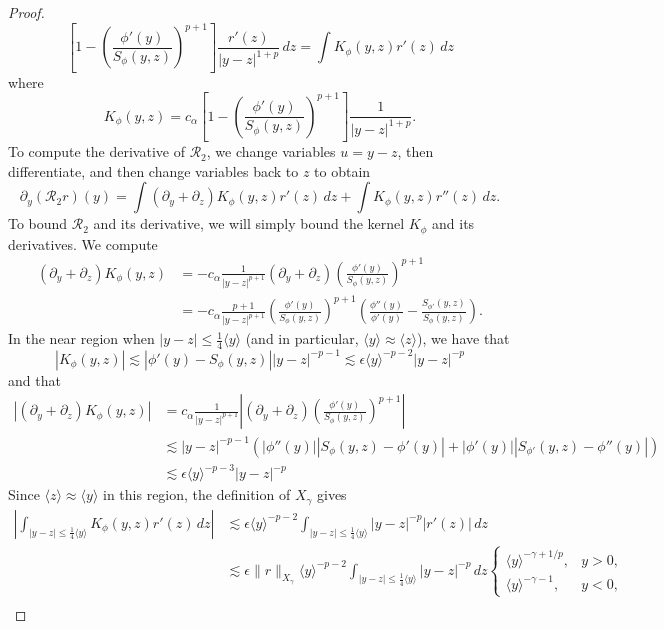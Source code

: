 \documentclass[11pt]{amsart}
\theoremstyle{definition}
\theoremstyle{remark}
\numberwithin{equation}{section}
\newcommand{\mc}[1]{\mathcal{#1}}
\newcommand{\ang}[1]{\langle #1 \rangle}
\begin{document}
\begin{proof}
\[        \left[1-\left(\frac{\phi'(y)}{S_\phi(y,z)}\right)^{p+1}\right]
        \frac{r'(z)}{|y-z|^{1+p}}\,dz = \int K_\phi(y, z)r'(z) \, dz\]
where
\[K_\phi(y, z) = c_\alpha\left[1-\left(\frac{\phi'(y)}{S_\phi(y,z)}\right)^{p+1}\right]\frac{1}{|y-z|^{1+p}}.\]
To compute the derivative of $\mc{R}_2$, we change variables $u = y - z$, then differentiate, and then change variables back to $z$ to obtain
\[\partial_y(\mc{R}_2r)(y) = \int (\partial_y + \partial_z) K_\phi(y, z) r'(z) \, dz + \int K_\phi(y, z) r''(z) \, dz.\]
To bound $\mc{R}_2$ and its derivative, we will simply bound the kernel $K_\phi$ and its derivatives.
We compute 
\begin{align*}
    (\partial_y + \partial_z)K_\phi(y, z) & = -c_\alpha \frac{1}{|y - z|^{p + 1}}(\partial_y + \partial_z)\left(\frac{\phi'(y)}{S_\phi(y,z)}\right)^{p+1} \\
    & = -c_\alpha \frac{p + 1}{|y - z|^{p + 1}}\left(\frac{\phi'(y)}{S_\phi(y,z)}\right)^{p+1}\left(\frac{\phi''(y)}{\phi'(y)} - \frac{S_{\phi'}(y, z)}{S_\phi(y,z)}\right).
\end{align*}
In the near region when $|y - z| \leq \frac{1}{4}\ang{y}$ (and in particular, $\ang{y} \approx \ang{z}$), we have that
\[|K_\phi(y, z)| \lesssim |\phi'(y) - S_\phi(y, z)||y - z|^{-p-1} \lesssim \epsilon \ang{y}^{-p - 2}|y - z|^{-p}\]
and that
\begin{align*}
    |(\partial_y + \partial_z)K_\phi(y, z)| & = c_\alpha \frac{1}{|y - z|^{p + 1}}\left|(\partial_y + \partial_z)\left(\frac{\phi'(y)}{S_\phi(y,z)}\right)^{p+1}\right| \\
    & \lesssim |y - z|^{-p-1}(|\phi''(y)||S_\phi(y,z) - \phi'(y)| + |\phi'(y)||S_{\phi'}(y,z) - \phi''(y)|) \\
    & \lesssim \epsilon \ang{y}^{-p - 3}|y - z|^{-p}
\end{align*}
Since $\ang{z}\approx\ang{y}$ in this region, the definition of $X_\gamma$ gives
\begin{align*}
    \left|\int_{|y - z| \leq \frac{1}{4}\ang{y}} K_\phi(y, z) r'(z) \, dz\right| & \lesssim \epsilon \ang{y}^{-p-2}\int_{|y - z| \leq \frac{1}{4}\ang{y}} |y - z|^{-p}|r'(z)| \, dz \\
    & \lesssim \epsilon \|r\|_{X_\gamma}\ang{y}^{-p-2}\int_{|y - z| \leq \frac{1}{4}\ang{y}} |y - z|^{-p} \, dz \begin{cases}
        \ang{y}^{-\gamma+1/p}, & y>0,\\
        \ang{y}^{-\gamma-1}, & y<0,
    \end{cases}\\

\end{align*}
\end{proof}
\end{document}
